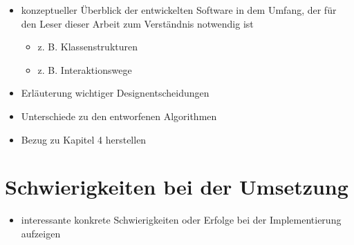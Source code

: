 \documentclass[../main/thesis.tex]{subfiles}
\begin{document}



\begin{itemize}
	\item konzeptueller Überblick der entwickelten Software in dem Umfang, der für den Leser dieser Arbeit zum Verständnis notwendig ist
	\begin{itemize}
		\item z. B. Klassenstrukturen
		\item z. B. Interaktionswege
	\end{itemize}
	\item Erläuterung wichtiger Designentscheidungen
	\item Unterschiede zu den entworfenen Algorithmen
	\item Bezug zu Kapitel 4 herstellen
\end{itemize}



\section{Schwierigkeiten bei der Umsetzung}
\label{ch:impl-difficulties}





\begin{itemize}
	\item interessante konkrete Schwierigkeiten oder Erfolge bei der Implementierung aufzeigen
\end{itemize}



\onlyinsubfile{\listoffigures}
\onlyinsubfile{}
\end{document}
